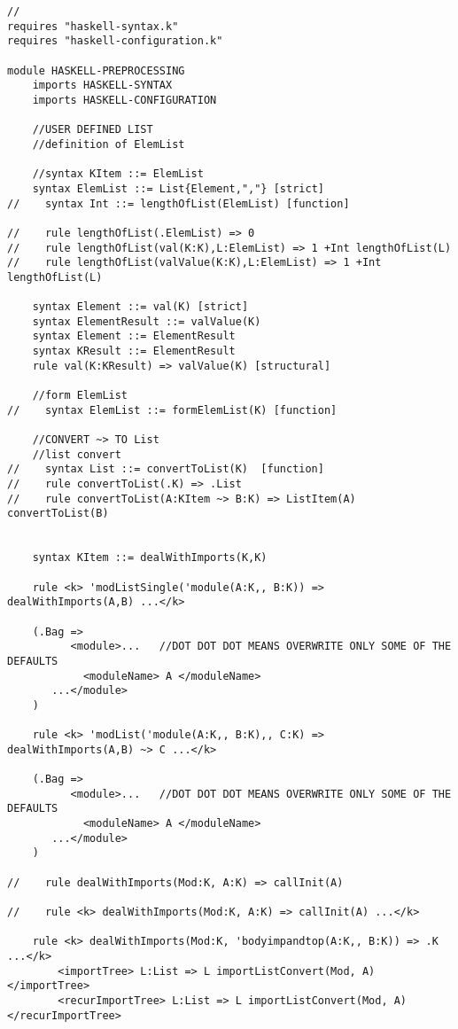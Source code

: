 \begin{lstlisting}
//
requires "haskell-syntax.k"
requires "haskell-configuration.k"

module HASKELL-PREPROCESSING
    imports HASKELL-SYNTAX
    imports HASKELL-CONFIGURATION

    //USER DEFINED LIST
    //definition of ElemList

    //syntax KItem ::= ElemList
    syntax ElemList ::= List{Element,","} [strict]
//    syntax Int ::= lengthOfList(ElemList) [function]

//    rule lengthOfList(.ElemList) => 0
//    rule lengthOfList(val(K:K),L:ElemList) => 1 +Int lengthOfList(L)
//    rule lengthOfList(valValue(K:K),L:ElemList) => 1 +Int lengthOfList(L)

    syntax Element ::= val(K) [strict]
    syntax ElementResult ::= valValue(K)
    syntax Element ::= ElementResult
    syntax KResult ::= ElementResult
    rule val(K:KResult) => valValue(K) [structural]

    //form ElemList
//    syntax ElemList ::= formElemList(K) [function]

    //CONVERT ~> TO List
    //list convert
//    syntax List ::= convertToList(K)  [function]
//    rule convertToList(.K) => .List
//    rule convertToList(A:KItem ~> B:K) => ListItem(A) convertToList(B)


    syntax KItem ::= dealWithImports(K,K)

    rule <k> 'modListSingle('module(A:K,, B:K)) => dealWithImports(A,B) ...</k>

    (.Bag =>
          <module>...   //DOT DOT DOT MEANS OVERWRITE ONLY SOME OF THE DEFAULTS
    	    <moduleName> A </moduleName>
       ...</module>
    )

    rule <k> 'modList('module(A:K,, B:K),, C:K) => dealWithImports(A,B) ~> C ...</k>

    (.Bag =>
          <module>...   //DOT DOT DOT MEANS OVERWRITE ONLY SOME OF THE DEFAULTS
    	    <moduleName> A </moduleName>
       ...</module>
    )

//    rule dealWithImports(Mod:K, A:K) => callInit(A)

//    rule <k> dealWithImports(Mod:K, A:K) => callInit(A) ...</k>

    rule <k> dealWithImports(Mod:K, 'bodyimpandtop(A:K,, B:K)) => .K ...</k>
        <importTree> L:List => L importListConvert(Mod, A) </importTree>
        <recurImportTree> L:List => L importListConvert(Mod, A) </recurImportTree>


\end{lstlisting}
